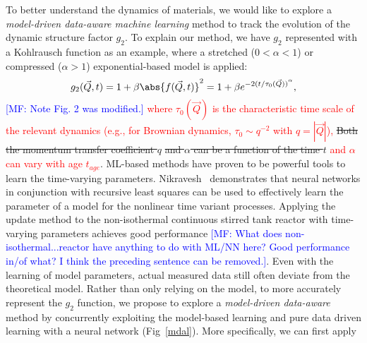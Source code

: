  To better understand the dynamics of materials, we would like to explore a {\em model-driven data-aware machine learning} method to track the evolution of the dynamic structure factor $g_2$. To explain our method,  we have $g_2$  represented with a Kohlrausch function as an example, where  a stretched ($0<\alpha<1$) or compressed ($\alpha>1$) exponential-based model is applied:
\begin{equation}
g_2(\vec{Q},t) = 1+ \beta \abs{f(\vec{Q},t)}^2 = 1 + \beta e^{-2{(t/\tau_{0}(\vec{Q}))}^\alpha}, %
\end{equation}
%
\textcolor{blue}{[MF: Note Fig. 2 was modified.]}
\textcolor{red}{where $\tau_{0}(\vec{Q})$ is the characteristic time scale of the relevant dynamics (e.g., for Brownian dynamics, $\tau_{0} \sim q^{-2}$ with $q = |\vec{Q}|$),}
\sout{Both the  momentum transfer coefficient $q$}
\sout{and $\alpha$  can be a function of the time $t$} 
 \textcolor{red}{and $\alpha$ can vary with age $t_{age}$}. ML-based methods have proven to be powerful tools to learn the time-varying parameters. Nikravesh~\cite{Nikravesh1996Model} demonstrates that neural networks in conjunction with recursive least squares can be used to effectively learn the parameter of a model for the nonlinear time variant processes. Applying the update method to the non-isothermal continuous stirred tank reactor with time-varying parameters achieves good performance 
 \textcolor{blue}{[MF: What does non-isothermal...reactor have anything to do with ML/NN here? Good performance in/of what? I think the preceding sentence can be removed.]}. Even with the learning of model parameters,  actual measured data still often deviate from the theoretical model. Rather than only relying on the model, to more accurately represent the $g_2$ function, we propose to explore  a {\em model-driven data-aware}  method by concurrently exploiting the model-based learning and pure data driven learning with a neural network (Fig~\ref{mdal}). More specifically, we can first apply

